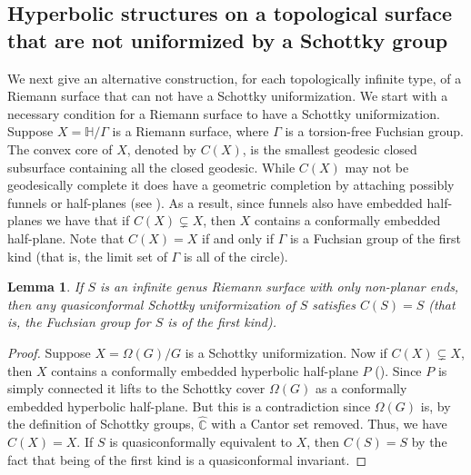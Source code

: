 \documentclass[12pt]{amsart}
\theoremstyle{plain}
\newtheorem{lem}[thm]{Lemma}
\begin{document}
\subsection{Hyperbolic structures on a topological surface that are not unifor\-mized by a Schottky group}
We next give an alternative construction, for each topologically infinite type,  of a Riemann surface that can not have a Schottky uniformization.  We start with a necessary condition for a Riemann surface to have a Schottky uniformization. 
Suppose $X=\mathbb{H}/\Gamma$  is a Riemann surface, where
$\Gamma$ is a torsion-free Fuchsian group. The convex core of 
$X$, denoted by $C(X)$,  is the smallest geodesic closed subsurface containing all the closed geodesic.  While $C(X)$ may not be geodesically complete it does have a geometric completion by attaching possibly funnels or half-planes (see \cite{B-S}).   As a result,
since funnels also have embedded half-planes we have that if $C(X) \subsetneq X$, then $X$ contains a conformally 
embedded half-plane.  Note that $C(X)=X$ if and only if $\Gamma$ is a Fuchsian group of the first kind (that is,
the limit set of $\Gamma$ is all of the circle).


\begin{lem}\label{lem: geometric criteria}
If $S$ is an infinite genus Riemann surface with only non-planar ends, then any quasiconformal Schottky uniformization of $S$
satisfies $C(S)=S$ (that is, the Fuchsian group for $S$ is of the first kind).
\end{lem}

\begin{proof}
Suppose $X=\Omega(G) /G$ is a Schottky uniformization.
Now if $C(X) \subsetneq X$, then $X$ contains a conformally embedded hyperbolic half-plane $P$ (\cite[Cor.3.6]{B-S}). Since $P$ is simply connected it lifts to the Schottky cover $\Omega(G)$ as a conformally embedded hyperbolic half-plane. But this is a contradiction since $\Omega(G)$ is, by the definition of Schottky groups, 
$\widehat{\mathbb{C}}$ with a Cantor set removed. Thus, we have $C(X)=X$. If $S$ is quasiconformally equivalent to $X$, then
$C(S)=S$ by the fact that being of the first kind is a quasiconformal invariant.
\end{proof}
\end{document}
